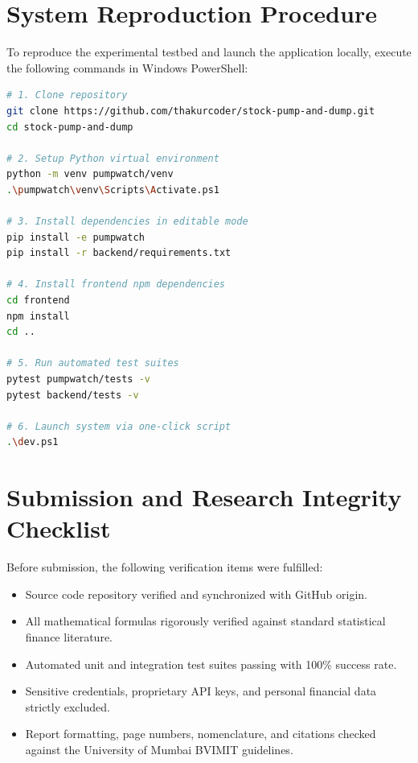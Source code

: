 \section{System Reproduction Procedure}
To reproduce the experimental testbed and launch the application locally, execute the following commands in Windows PowerShell:

\begin{lstlisting}[language=bash, caption={Complete reproduction and execution script}]
# 1. Clone repository
git clone https://github.com/thakurcoder/stock-pump-and-dump.git
cd stock-pump-and-dump

# 2. Setup Python virtual environment
python -m venv pumpwatch/venv
.\pumpwatch\venv\Scripts\Activate.ps1

# 3. Install dependencies in editable mode
pip install -e pumpwatch
pip install -r backend/requirements.txt

# 4. Install frontend npm dependencies
cd frontend
npm install
cd ..

# 5. Run automated test suites
pytest pumpwatch/tests -v
pytest backend/tests -v

# 6. Launch system via one-click script
.\dev.ps1
\end{lstlisting}

\section{Submission and Research Integrity Checklist}
Before submission, the following verification items were fulfilled:
\begin{itemize}
    \item Source code repository verified and synchronized with GitHub origin.
    \item All mathematical formulas rigorously verified against standard statistical finance literature.
    \item Automated unit and integration test suites passing with 100\% success rate.
    \item Sensitive credentials, proprietary API keys, and personal financial data strictly excluded.
    \item Report formatting, page numbers, nomenclature, and citations checked against the University of Mumbai BVIMIT guidelines.
\end{itemize}

